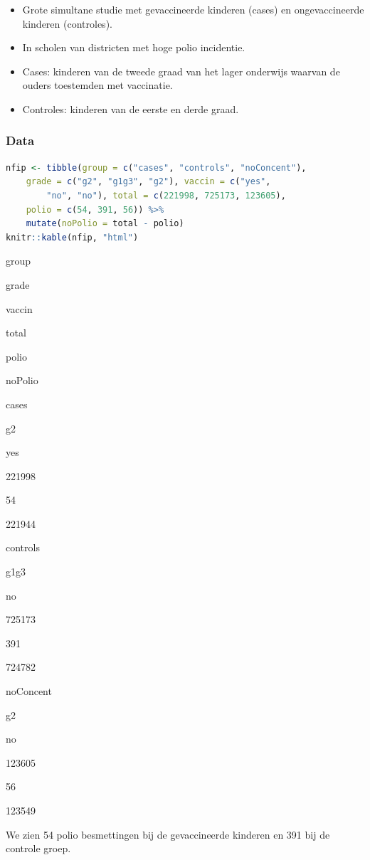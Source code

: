 \documentclass[
  12pt,dutch,coursenotes]{book}
\providecommand{\tightlist}{%
  \setlength{\itemsep}{0pt}\setlength{\parskip}{0pt}}
\theoremstyle{definition}
\theoremstyle{definition}
\theoremstyle{definition}
\theoremstyle{definition}
\theoremstyle{remark}
\begin{document}
\begin{itemize}
\tightlist
\item
  Grote simultane studie met gevaccineerde kinderen (cases) en ongevaccineerde kinderen (controles).
\item
  In scholen van districten met hoge polio incidentie.
\item
  Cases: kinderen van de tweede graad van het lager onderwijs waarvan de ouders toestemden met vaccinatie.
\item
  Controles: kinderen van de eerste en derde graad.
\end{itemize}

\hypertarget{data}{%
\subsubsection{Data}\label{data}}

\begin{lstlisting}[language=R]
nfip <- tibble(group = c("cases", "controls", "noConcent"),
    grade = c("g2", "g1g3", "g2"), vaccin = c("yes",
        "no", "no"), total = c(221998, 725173, 123605),
    polio = c(54, 391, 56)) %>%
    mutate(noPolio = total - polio)
knitr::kable(nfip, "html")
\end{lstlisting}

group

grade

vaccin

total

polio

noPolio

cases

g2

yes

221998

54

221944

controls

g1g3

no

725173

391

724782

noConcent

g2

no

123605

56

123549

We zien 54 polio besmettingen bij de gevaccineerde kinderen
en 391 bij de controle groep.
\end{document}
